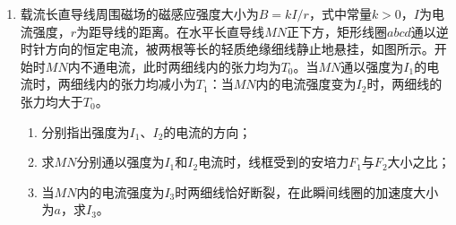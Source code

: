 \begin{enumerate}
\begin{enumerate}
\end{enumerate}
\begin{figure}[h!]
\flushright

\end{figure}








\newpage
\item
{}
载流长直导线周围磁场的磁感应强度大小为$ B=kI/r $，式中常量$ k>0 $，$ I $为电流强度，$ r $为距导线的距离。在水平长直导线$ MN $正下方，矩形线圈$ abcd $通以逆时针方向的恒定电流，被两根等长的轻质绝缘细线静止地悬挂，如图所示。开始时$ MN $内不通电流，此时两细线内的张力均为$ T_{0} $。当$ MN $通以强度为$ I_{1} $的电流时，两细线内的张力均减小为$ T_{1} $：当$ MN $内的电流强度变为$ I_{2} $时，两细线的张力均大于$ T_{0} $。
\begin{enumerate}
\renewcommand{\labelenumi}{\arabic{enumi}.}
\item
分别指出强度为$ I_{1} $、$ I_{2} $的电流的方向；
\item 
求$ MN $分别通以强度为$ I_{1} $和$ I_{2} $电流时，线框受到的安培力$ F_{1} $与$ F_{2} $大小之比；
\item 
当$ MN $内的电流强度为$ I_{3} $时两细线恰好断裂，在此瞬间线圈的加速度大小为$ a $，求$ I_{3} $。


\end{enumerate}
\begin{figure}[h!]
\flushright

\end{figure}



\end{enumerate}
